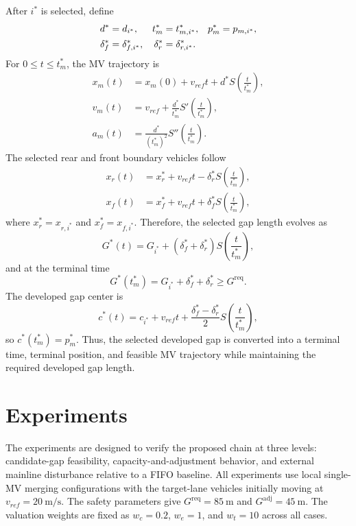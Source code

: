 \documentclass[conference]{IEEEtran}
\begin{document}
After \(i^*\) is selected, define
\begin{align}
    d^*&=d_{i^*},&
    t_m^*&=t_{m,i^*}^*,&
    p_m^*&=p_{m,i^*}, \notag\\
    \delta_f^*&=\delta_{f,i^*}^*,&
    \delta_r^*&=\delta_{r,i^*}^*. \label{eq:selected_quantities}
\end{align}
For \(0\leq t\leq t_m^*\), the MV trajectory is
\begin{align}
    x_m(t)
    &=
    x_m(0)+v_{ref}t+
    d^*S\left(\frac{t}{t_m^*}\right), \label{eq:mv_position}\\
    v_m(t)
    &=
    v_{ref}
    +
    \frac{d^*}{t_m^*}
    S'\left(\frac{t}{t_m^*}\right), \label{eq:mv_velocity}\\
    a_m(t)
    &=
    \frac{d^*}{(t_m^*)^2}
    S''\left(\frac{t}{t_m^*}\right). \label{eq:mv_acc}
\end{align}
The selected rear and front boundary vehicles follow
\begin{align}
    x_r(t)
    &=
    x_r^*+v_{ref}t-
    \delta_r^*S\left(\frac{t}{t_m^*}\right), \label{eq:rear_traj}\\
    x_f(t)
    &=
    x_f^*+v_{ref}t+
    \delta_f^*S\left(\frac{t}{t_m^*}\right), \label{eq:front_traj}
\end{align}
where \(x_r^*=x_{r,i^*}\) and \(x_f^*=x_{f,i^*}\). Therefore, the selected
gap length evolves as
\begin{equation}
    G^*(t)
    =
    G_{i^*}
    +
    (\delta_f^*+\delta_r^*)
    S\left(\frac{t}{t_m^*}\right),
    \label{eq:dynamic_gap}
\end{equation}
and at the terminal time
\begin{equation}
    G^*(t_m^*)=G_{i^*}+\delta_f^*+\delta_r^*
    \geq G^{\mathrm{req}}.
    \label{eq:terminal_gap}
\end{equation}
The developed gap center is
\begin{equation}
    c^*(t)
    =
    c_{i^*}+v_{ref}t+
    \frac{\delta_f^*-\delta_r^*}{2}
    S\left(\frac{t}{t_m^*}\right),
    \label{eq:dynamic_center}
\end{equation}
so \(c^*(t_m^*)=p_m^*\). Thus, the selected developed gap is converted into a
terminal time, terminal position, and feasible MV trajectory while maintaining
the required developed gap length.

\section{Experiments}
The experiments are designed to verify the proposed chain at three levels:
candidate-gap feasibility, capacity-and-adjustment behavior, and external
mainline disturbance relative to a FIFO baseline. All experiments use local
single-MV merging configurations with the target-lane vehicles initially moving
at \(v_{ref}=20~\mathrm{m/s}\). The safety parameters give
\(G^{\mathrm{req}}=85~\mathrm{m}\) and
\(G^{\mathrm{adj}}=45~\mathrm{m}\). The valuation weights are fixed as
\(w_c=0.2\), \(w_e=1\), and \(w_t=10\) across all cases.
\end{document}
